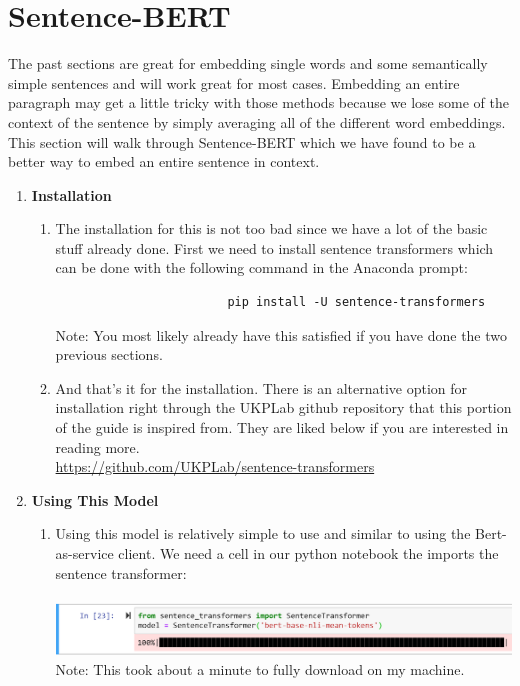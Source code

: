 \documentclass{article}
\begin{document}
\section*{Sentence-BERT}

The past sections are great for embedding single words and some semantically simple sentences and will work great for most cases.  Embedding an entire paragraph may get a little tricky with those methods because we lose some of the context of the sentence by simply averaging all of the different word embeddings. This section will walk through Sentence-BERT which we have found to be a better way to embed an entire sentence in context.

\begin{enumerate}
    \item \textbf{Installation}
    \begin{enumerate}
    \item[]
    The installation for this is not too bad since we have a lot of the basic stuff already done. First we need to install sentence transformers which can be done with the following command in the Anaconda prompt:
    
    \begin{verbatim}
                        pip install -U sentence-transformers
    \end{verbatim}
    Note: You most likely already have this satisfied if you have done the two previous sections. 
    \item[] And that's it for the installation.  There is an alternative option for installation right through the UKPLab github repository that this portion of the guide is inspired from. They are liked below if you are interested in reading more. \\\url{https://github.com/UKPLab/sentence-transformers}
    
    \end{enumerate}
    
    \item \textbf{Using This Model}
    \begin{enumerate}
        \item[] Using this model is relatively simple to use and similar to using the Bert-as-service client. We need a cell in our python notebook the imports the sentence transformer:\\
        \vspace{.1cm}\\
        \includegraphics[scale = .77]{import_transform.png}
        \vspace{.1cm}\\
        Note: This took about a minute to fully download on my machine.
        

\end{enumerate}
\end{enumerate}
\end{document}
